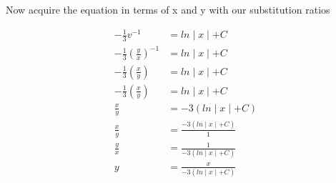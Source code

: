 \documentclass{article}
\begin{document}
\begin{flushleft}
{Now acquire the equation in terms of x and y with our substitution ratios

\begin{align*}
-\frac{1}{3}v^{-1} & = ln\mid x \mid + C \\
-\frac{1}{3}(\frac{y}{x})^{-1} & = ln\mid x \mid + C \\
-\frac{1}{3}(\frac{x}{y}) & = ln\mid x \mid + C \\
-\frac{1}{3}(\frac{x}{y}) & = ln\mid x \mid + C \\
\frac{x}{y} & = -3 (ln\mid x \mid + C) \\
\frac{x}{y} & = \frac{ -3 (ln\mid x \mid + C) }{1} \\
\frac{y}{x} & = \frac{1}{ -3 (ln\mid x \mid + C) } \\
y & =  \frac{x}{ -3 (ln\mid x \mid + C) } \\
\end{align*}

}


\end{flushleft}
\end{document}
